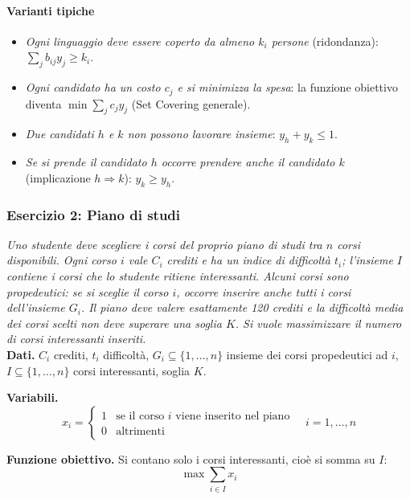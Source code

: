 \documentclass[12pt]{extarticle} %
\begin{document}
\paragraph{Varianti tipiche}
\begin{itemize}
    \item \textit{Ogni linguaggio deve essere coperto da almeno $k_i$ persone} (ridondanza): $\sum_j b_{ij}y_j \ge k_i$.
    \item \textit{Ogni candidato ha un costo $c_j$ e si minimizza la spesa}: la funzione obiettivo diventa $\min \sum_j c_j y_j$ (Set Covering generale).
    \item \textit{Due candidati $h$ e $k$ non possono lavorare insieme}: $y_h + y_k \le 1$.
    \item \textit{Se si prende il candidato $h$ occorre prendere anche il candidato $k$} (implicazione $h \Rightarrow k$): $y_k \ge y_h$.
\end{itemize}

\subsubsection{Esercizio 2: Piano di studi}
\textit{Uno studente deve scegliere i corsi del proprio piano di studi tra $n$ corsi disponibili. Ogni corso $i$ vale $C_i$ crediti e ha un indice di difficoltà $t_i$; l'insieme $I$ contiene i corsi che lo studente ritiene interessanti. Alcuni corsi sono propedeutici: se si sceglie il corso $i$, occorre inserire anche tutti i corsi dell'insieme $G_i$. Il piano deve valere esattamente 120 crediti e la difficoltà media dei corsi scelti non deve superare una soglia $K$. Si vuole massimizzare il numero di corsi interessanti inseriti.}\\

\noindent\textbf{Dati.} $C_i$ crediti, $t_i$ difficoltà, $G_i \subseteq \{1,\dots,n\}$ insieme dei corsi propedeutici ad $i$, $I \subseteq \{1,\dots,n\}$ corsi interessanti, soglia $K$.

\noindent\textbf{Variabili.}
\[
x_i = \begin{cases} 1 & \text{se il corso } i \text{ viene inserito nel piano}\\ 0 & \text{altrimenti}\end{cases} \quad i=1,\dots,n
\]

\noindent\textbf{Funzione obiettivo.} Si contano solo i corsi interessanti, cioè si somma su $I$:
\[
\max \sum_{i \in I} x_i
\]
\end{document}
